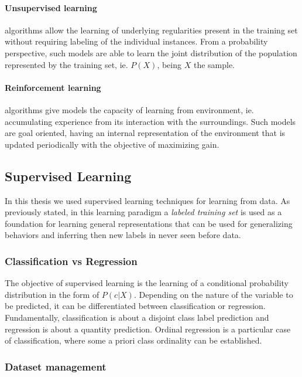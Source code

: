 \paragraph{Unsupervised learning} algorithms allow the learning of underlying regularities present in the training set without requiring labeling of the individual instances. From a probability perspective, such models are able to learn the joint distribution of the population represented by the training set, ie. $P(X)$, being $X$ the sample.

\paragraph{Reinforcement learning} algorithms give models the capacity of learning from environment, ie. accumulating experience from its interaction with the surroundings. Such models are goal oriented,  having an internal representation of the environment that is updated periodically with the objective of maximizing gain.

\subsection{Supervised Learning}

In this thesis we used supervised learning techniques for learning from data. As previously stated, in this learning paradigm a \emph{labeled training set} is used as a foundation for learning general representations that can be used for generalizing behaviors and inferring then new labels in never seen before data.

\subsubsection{Classification vs Regression}

The objective of supervised learning is the learning of a conditional probability distribution in the form of $P(c|X)$. Depending on the nature of the variable to be predicted, it can be differentiated between classification or regression. Fundamentally, classification is about a disjoint class label prediction and regression is about a quantity prediction. Ordinal regression is a particular case of classification, where some a priori class ordinality can be established.

\subsubsection{Dataset management}

